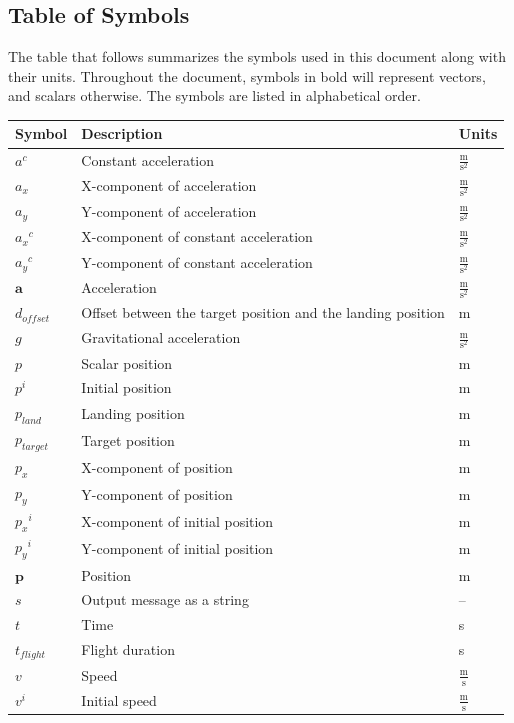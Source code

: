 \documentclass[12pt]{article}
\begin{document}
\subsection{Table of Symbols}
\label{Sec:ToS}
The table that follows summarizes the symbols used in this document along with their units. Throughout the document, symbols in bold will represent vectors, and scalars otherwise. The symbols are listed in alphabetical order.
\begin{longtabu}{l X[l] l}
\toprule
Symbol & Description & Units
\\
\midrule
\endhead
${a^{c}}$ & Constant acceleration & $\frac{\text{m}}{\text{s}^{2}}$
\\
${a_{x}}$ & X-component of acceleration & $\frac{\text{m}}{\text{s}^{2}}$
\\
${a_{y}}$ & Y-component of acceleration & $\frac{\text{m}}{\text{s}^{2}}$
\\
${{a_{x}}^{c}}$ & X-component of constant acceleration & $\frac{\text{m}}{\text{s}^{2}}$
\\
${{a_{y}}^{c}}$ & Y-component of constant acceleration & $\frac{\text{m}}{\text{s}^{2}}$
\\
$\mathbf{a}$ & Acceleration & $\frac{\text{m}}{\text{s}^{2}}$
\\
${d_{offset}}$ & Offset between the target position and the landing position & m
\\
$g$ & Gravitational acceleration & $\frac{\text{m}}{\text{s}^{2}}$
\\
$p$ & Scalar position & m
\\
${p^{i}}$ & Initial position & m
\\
${p_{land}}$ & Landing position & m
\\
${p_{target}}$ & Target position & m
\\
${p_{x}}$ & X-component of position & m
\\
${p_{y}}$ & Y-component of position & m
\\
${{p_{x}}^{i}}$ & X-component of initial position & m
\\
${{p_{y}}^{i}}$ & Y-component of initial position & m
\\
$\mathbf{p}$ & Position & m
\\
$s$ & Output message as a string & --
\\
$t$ & Time & s
\\
${t_{flight}}$ & Flight duration & s
\\
$v$ & Speed & $\frac{\text{m}}{\text{s}}$
\\
${v^{i}}$ & Initial speed & $\frac{\text{m}}{\text{s}}$

\end{longtabu}
\end{document}
